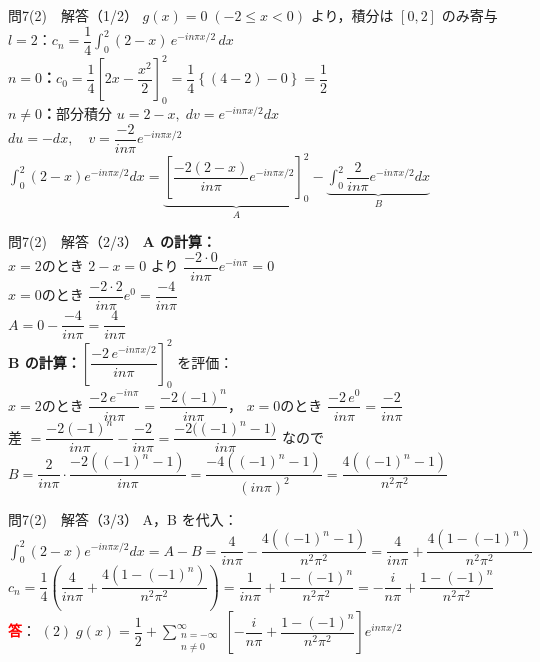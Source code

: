 \documentclass[professionalfonts]{beamer}
\begin{document}
\begin{frame}{問7(2)　解答（1/2）}
  $g(x)=0\;(-2\leq x<0)$ より，積分は $[0,2]$ のみ寄与\\[4pt]
  $l=2$：$c_{n} = \dfrac{1}{4}\displaystyle\int_{0}^{2}(2-x)\,e^{-in\pi x/2}\,dx$\\[4pt]
  \textbf{$n=0$：}$c_{0} = \dfrac{1}{4}\!\left[2x-\dfrac{x^{2}}{2}\right]_{0}^{2}
    = \dfrac{1}{4}\!\left\{(4-2)-0\right\} = \dfrac{1}{2}$\\[4pt]
  \textbf{$n\neq 0$：}部分積分 $u=2-x,\;dv=e^{-in\pi x/2}dx$\\[2pt]
  \hspace{2em}$du=-dx,\quad v=\dfrac{-2}{in\pi}e^{-in\pi x/2}$\\[4pt]
  $\displaystyle\int_{0}^{2}(2-x)e^{-in\pi x/2}dx
    = \underbrace{\!\left[\dfrac{-2(2-x)}{in\pi}e^{-in\pi x/2}\right]_{0}^{2}}_{A}
      - \underbrace{\int_{0}^{2}\dfrac{2}{in\pi}e^{-in\pi x/2}dx}_{B}$
\end{frame}

\begin{frame}{問7(2)　解答（2/3）}
  \textbf{A の計算：}\\[2pt]
  $x=2$のとき $2-x=0$ より $\dfrac{-2\cdot 0}{in\pi}e^{-in\pi}=0$\\[2pt]
  $x=0$のとき $\dfrac{-2\cdot 2}{in\pi}e^{0}=\dfrac{-4}{in\pi}$\\[2pt]
  $A = 0 - \dfrac{-4}{in\pi} = \dfrac{4}{in\pi}$\\[6pt]
  \textbf{B の計算：}$\left[\dfrac{-2\,e^{-in\pi x/2}}{in\pi}\right]_{0}^{2}$ を評価：\\[2pt]
  $x=2$のとき $\dfrac{-2\,e^{-in\pi}}{in\pi}=\dfrac{-2(-1)^{n}}{in\pi}$，
  $x=0$のとき $\dfrac{-2\,e^{0}}{in\pi}=\dfrac{-2}{in\pi}$\\[2pt]
  差 $= \dfrac{-2(-1)^{n}}{in\pi}-\dfrac{-2}{in\pi} = \dfrac{-2\bigl((-1)^{n}-1\bigr)}{in\pi}$
  なので\\[4pt]
  $B = \dfrac{2}{in\pi}\cdot\dfrac{-2((-1)^{n}-1)}{in\pi}
    = \dfrac{-4((-1)^{n}-1)}{(in\pi)^{2}} = \dfrac{4((-1)^{n}-1)}{n^{2}\pi^{2}}$
\end{frame}

\begin{frame}{問7(2)　解答（3/3）}
  A，B を代入：\\[4pt]
  $\displaystyle\int_{0}^{2}(2-x)e^{-in\pi x/2}dx = A - B
    = \dfrac{4}{in\pi} - \dfrac{4((-1)^{n}-1)}{n^{2}\pi^{2}}
    = \dfrac{4}{in\pi} + \dfrac{4(1-(-1)^{n})}{n^{2}\pi^{2}}$\\[6pt]
  $c_{n} = \dfrac{1}{4}\!\left(\dfrac{4}{in\pi} + \dfrac{4(1-(-1)^{n})}{n^{2}\pi^{2}}\right)
    = \dfrac{1}{in\pi} + \dfrac{1-(-1)^{n}}{n^{2}\pi^{2}}
    = -\dfrac{i}{n\pi} + \dfrac{1-(-1)^{n}}{n^{2}\pi^{2}}$
  \hspace{4pt}{\footnotesize\textcolor{gray}{$1/(in)=-i/n$ を利用}}
  \\[8pt]\textcolor{red}{\textbf{答}}：
  $(2)\; g(x) = \dfrac{1}{2} + \displaystyle\sum_{\substack{n=-\infty \\ n\neq 0}}^{\infty} \!\left[-\dfrac{i}{n\pi}+\dfrac{1-(-1)^{n}}{n^{2}\pi^{2}}\right] e^{in\pi x/2}$\\
\end{frame}
\end{document}
